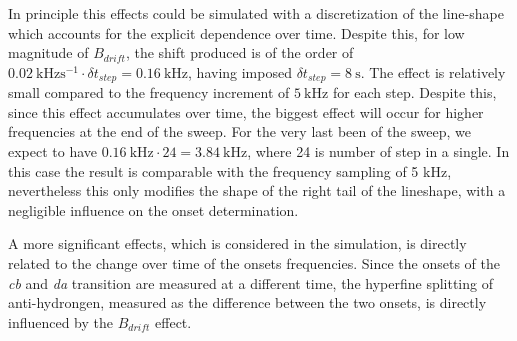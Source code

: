 \documentclass[11pt,a4paper,oneside]{article}
\begin{document}
In principle this effects could be simulated with a discretization of the line-shape which accounts for the explicit dependence over time. Despite this, for low magnitude of $B_{drift}$, the shift produced is of the order of $\SI{0.02}{\kilo \hertz \second \tothe{-1}} \cdot \delta t_{step} = \SI{0.16}{\kilo \hertz}$, having imposed $\delta t_{step} =\SI{8}{\second}$. The effect is relatively small compared to the frequency increment of $\SI{5}{\kilo \hertz}$ for each step. Despite this, since this effect accumulates over time, the biggest effect will occur for higher frequencies at the end of the sweep. For the very last been of the sweep, we expect to have $ \SI{0.16}{\kilo \hertz} \cdot 24  = \SI{3.84}{\kilo \hertz} $, where 24 is number of step in a single. In this case the result is comparable with the frequency sampling of 5 kHz, nevertheless this only modifies the shape of the right tail of the lineshape, with a negligible influence on the onset determination.

A more significant effects, which is considered in the simulation, is directly related to the change over time of the onsets frequencies. Since the onsets of the \textit{cb} and \textit{da} transition are measured at a different time, the hyperfine splitting of anti-hydrongen, measured as the difference between the two onsets, is directly influenced by the $B_{drift}$ effect. 
\end{document}
